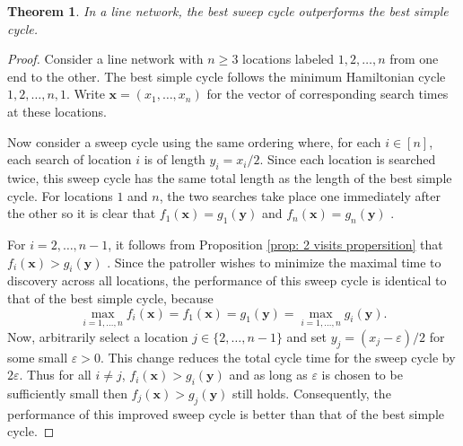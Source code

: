 \documentclass[11pt,a4paper]{article}
\newtheorem{theorem}{Theorem}[section]
\begin{document}

\begin{theorem} \label{thm: sweep beats simple}
In a line network, the best sweep cycle outperforms the best simple cycle.    
\end{theorem}


\begin{proof}
Consider a line network with $n \geq 3$ locations labeled $1,2,\ldots,n$ from one end to the other.
The best simple cycle follows the minimum Hamiltonian cycle $1,2, \ldots, n, 1$. Write $\textbf{x} = ( x_1,\hdots,x_n )$ for the vector of corresponding search times at these locations.

Now consider a sweep cycle using the same ordering where, for each $i \in [n]$, each search of location $i$ is of length $y_i = x_i/2$.
Since each location is searched twice, this sweep cycle has the same total length as the length of the best simple cycle.
For locations $1$ and $n$, the two searches take place one immediately after the other so it is clear that $f_1(\textbf{x}) = g_1(\textbf{y})$ and
$f_n(\textbf{x}) = g_n(\textbf{y})$ .

For $i = 2,\hdots,n-1$, it follows from Proposition \ref{prop: 2 visits propersition} that $f_i(\textbf{x}) > g_i(\textbf{y})$ .
Since the patroller wishes to minimize the maximal time to discovery across all locations, the performance of this sweep cycle is identical to that of the best simple cycle, because
\[
\max_{i=1,\ldots,n} f_i (\mathbf{x}) = f_1(\mathbf{x}) = g_1(\mathbf{y}) = \max_{i=1,\ldots,n} g_i (\mathbf{y}).
\]
Now, arbitrarily select a location $j \in \{ 2,\hdots,n-1 \}$ and set $y_j = (x_j - \varepsilon)/2$ for some small $\varepsilon > 0$.
This change reduces the total cycle time for the sweep cycle by $2\varepsilon$.
Thus for all $i \neq j$, $f_i(\textbf{x}) > g_i(\textbf{y})$ and as long as $\varepsilon$ is chosen to be sufficiently small then $f_j(\textbf{x}) > g_j(\textbf{y})$ still holds.
Consequently, the performance of this improved sweep cycle is better than that of the best simple cycle.
\end{proof}
\end{document}
